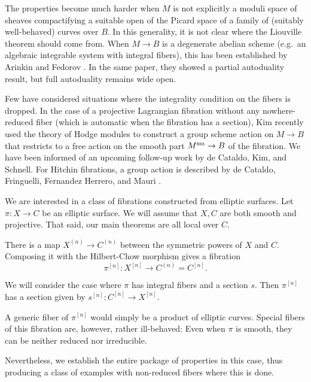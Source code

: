 \documentclass{amsart}
\theoremstyle{plain}
\theoremstyle{definition}
\theoremstyle{remark}
\begin{document}
    The properties become much harder when $M$ is not explicitly a moduli space of sheaves compactifying a suitable open of the Picard space of a family of (suitably well-behaved) curves over $B$.
    In this generality, it is not clear where the Liouville theorem should come from.
    When $M\to B$ is a degenerate abelian scheme (e.g.~an algebraic integrable system with integral fibers), this has been established by Arinkin and Fedorov \cite{arinkin-fedorov}.
    In the same paper, they showed a partial autoduality result, but full autoduality remains wide open.

    Few have considered situations where the integrality condition on the fibers is dropped.
    In the case of a projective Lagrangian fibration without any nowhere-reduced fiber (which is automatic when the fibration has a section), Kim \cite[\S4]{kim_neron} recently used the theory of Hodge modules to construct a group scheme action on $M\to B$ that restricts to a free action on the smooth part $M^{\rm sm}\to B$ of the fibration.
    We have been informed of an upcoming follow-up work by de Cataldo, Kim, and Schnell.
    For Hitchin fibrations, a group action is described by de Cataldo, Fringuelli, Fernandez Herrero, and Mauri \cite{hitchingp}.

    We are interested in a class of fibrations constructed from elliptic surfaces.
    Let $\pi:X\to C$ be an elliptic surface.
    We will assume that $X,C$ are both smooth and projective.
    That said, our main theorems are all local over $C$.

    There is a map $X^{(n)}\to C^{(n)}$ between the symmetric powers of $X$ and $C$.
    Composing it with the Hilbert-Chow morphism gives a fibration
    \[\pi^{[n]}:X^{[n]}\to C^{(n)}=C^{[n]}.\]

    We will consider the case where $\pi$ has integral fibers and a section $s$.
    Then $\pi^{[n]}$ has a section given by $s^{[n]}:C^{[n]}\to X^{[n]}$.

    A generic fiber of $\pi^{[n]}$ would simply be a product of elliptic curves.
    Special fibers of this fibration are, however, rather ill-behaved:
    Even when $\pi$ is smooth, they can be neither reduced nor irreducible.

    Nevertheless, we establish the entire package of properties in this case, thus producing a class of examples with non-reduced fibers where this is done.
\end{document}
